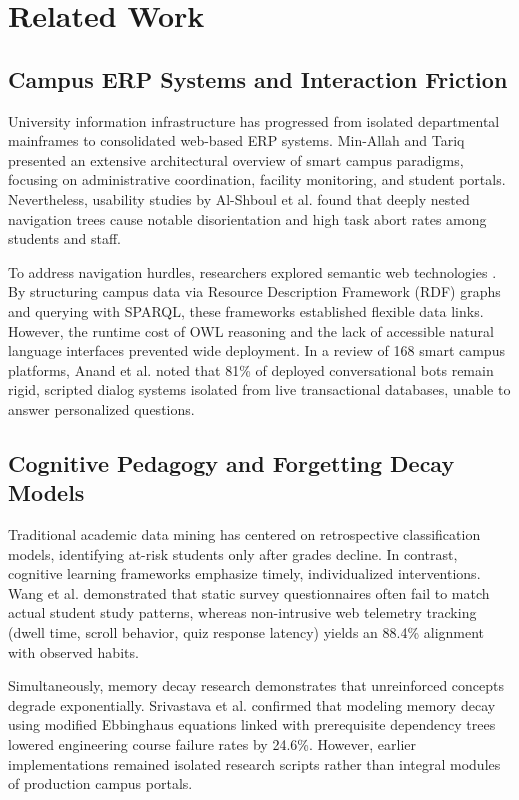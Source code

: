 \documentclass[conference]{IEEEtran}
\begin{document}
\section{Related Work}
\label{sec:literature}

\subsection{Campus ERP Systems and Interaction Friction}
University information infrastructure has progressed from isolated departmental mainframes to consolidated web-based ERP systems. Min-Allah and Tariq \cite{minallah2020smart} presented an extensive architectural overview of smart campus paradigms, focusing on administrative coordination, facility monitoring, and student portals. Nevertheless, usability studies by Al-Shboul et al. \cite{alshboul2020usability} found that deeply nested navigation trees cause notable disorientation and high task abort rates among students and staff.

To address navigation hurdles, researchers explored semantic web technologies \cite{deoliveira2021semantic}. By structuring campus data via Resource Description Framework (RDF) graphs and querying with SPARQL, these frameworks established flexible data links. However, the runtime cost of OWL reasoning and the lack of accessible natural language interfaces prevented wide deployment. In a review of 168 smart campus platforms, Anand et al. \cite{anand2024systematic} noted that 81\% of deployed conversational bots remain rigid, scripted dialog systems isolated from live transactional databases, unable to answer personalized questions.

\subsection{Cognitive Pedagogy and Forgetting Decay Models}
Traditional academic data mining has centered on retrospective classification models, identifying at-risk students only after grades decline. In contrast, cognitive learning frameworks emphasize timely, individualized interventions. Wang et al. \cite{wang2024telemetry} demonstrated that static survey questionnaires often fail to match actual student study patterns, whereas non-intrusive web telemetry tracking (dwell time, scroll behavior, quiz response latency) yields an 88.4\% alignment with observed habits.

Simultaneously, memory decay research demonstrates that unreinforced concepts degrade exponentially. Srivastava et al. \cite{srivastava2024forgetting} confirmed that modeling memory decay using modified Ebbinghaus equations linked with prerequisite dependency trees lowered engineering course failure rates by 24.6\%. However, earlier implementations remained isolated research scripts rather than integral modules of production campus portals.
\end{document}
